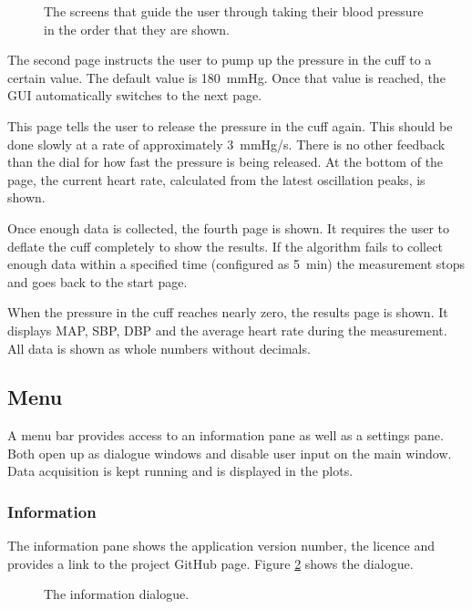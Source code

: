 \begin{figure}[ht]
\centering
\caption{The screens that guide the user through taking their blood pressure in the order that they are shown.}
\label{fig:UIguide}
\end{figure}

The second page instructs the user to pump up the pressure in the cuff to a certain value. The default value is \SI{180}{\mmHg}. Once that value is reached, the GUI automatically switches to the next page.

This page tells the user to release the pressure in the cuff again. This should be done slowly at a rate of approximately \SI{3}{\mmHg/\second}. There is no other feedback than the dial for how fast the pressure is being released. At the bottom of the page, the current heart rate, calculated from the latest oscillation peaks, is shown.

Once enough data is collected, the fourth page is shown. It requires the user to deflate the cuff completely to show the results. If the algorithm fails to collect enough data within a specified time (configured as \SI{5}{\minute}) the measurement stops and goes back to the start page.

When the pressure in the cuff reaches nearly zero, the results page is shown. It displays MAP, SBP, DBP and the average heart rate during the measurement. All data is shown as whole numbers without decimals. 

\subsection{Menu}
A menu bar provides access to an information pane as well as a settings pane. Both open up as dialogue windows and disable user input on the main window. Data acquisition is kept running and is displayed in the plots.

\subsubsection{Information}
The information pane shows the application version number, the licence and provides a link to the project GitHub page. Figure \ref{fig:UIinfo} shows the dialogue.

\begin{figure}[ht]
\centering
\caption{The information dialogue.}
\label{fig:UIinfo}
\end{figure}


